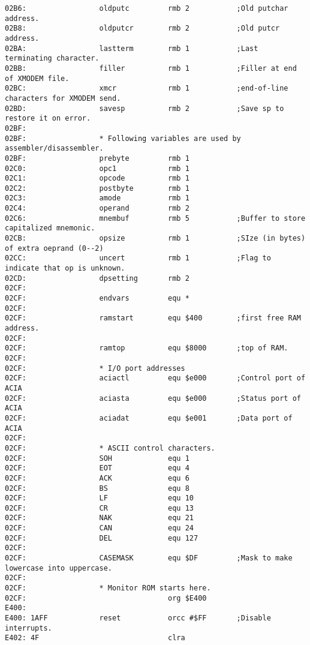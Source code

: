 {\begin{verbatim}
02B6:                 oldputc         rmb 2           ;Old putchar address.
02B8:                 oldputcr        rmb 2           ;Old putcr address.
02BA:                 lastterm        rmb 1           ;Last terminating character.
02BB:                 filler          rmb 1           ;Filler at end of XMODEM file.
02BC:                 xmcr            rmb 1           ;end-of-line characters for XMODEM send.
02BD:                 savesp          rmb 2           ;Save sp to restore it on error.
02BF:                 
02BF:                 * Following variables are used by assembler/disassembler.
02BF:                 prebyte         rmb 1
02C0:                 opc1            rmb 1
02C1:                 opcode          rmb 1
02C2:                 postbyte        rmb 1
02C3:                 amode           rmb 1
02C4:                 operand         rmb 2           
02C6:                 mnembuf         rmb 5           ;Buffer to store capitalized mnemonic.
02CB:                 opsize          rmb 1           ;SIze (in bytes) of extra oeprand (0--2)
02CC:                 uncert          rmb 1           ;Flag to indicate that op is unknown.
02CD:                 dpsetting       rmb 2
02CF:                 
02CF:                 endvars         equ *
02CF:                 
02CF:                 ramstart        equ $400        ;first free RAM address.
02CF:                 
02CF:                 ramtop          equ $8000       ;top of RAM.
02CF:                 
02CF:                 * I/O port addresses
02CF:                 aciactl         equ $e000       ;Control port of ACIA
02CF:                 aciasta         equ $e000       ;Status port of ACIA
02CF:                 aciadat         equ $e001       ;Data port of ACIA
02CF:                 
02CF:                 * ASCII control characters.
02CF:                 SOH             equ 1
02CF:                 EOT             equ 4
02CF:                 ACK             equ 6
02CF:                 BS              equ 8
02CF:                 LF              equ 10
02CF:                 CR              equ 13
02CF:                 NAK             equ 21
02CF:                 CAN             equ 24
02CF:                 DEL             equ 127
02CF:                 
02CF:                 CASEMASK        equ $DF         ;Mask to make lowercase into uppercase.
02CF:                 
02CF:                 * Monitor ROM starts here.
02CF:                                 org $E400
E400:                 
E400: 1AFF            reset           orcc #$FF       ;Disable interrupts.
E402: 4F                              clra            

\end{verbatim}}
